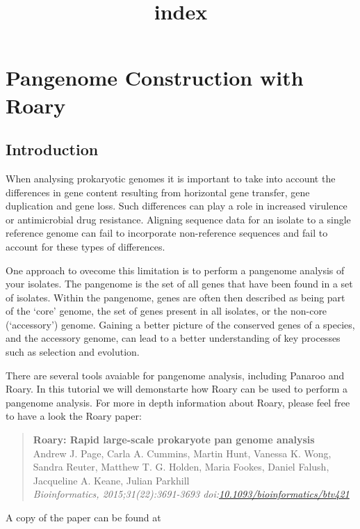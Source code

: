 \documentclass[11pt]{article}
\title{index}
\begin{document}
    \hypertarget{pangenome-construction-with-roary}{%
\section{Pangenome Construction with
Roary}\label{pangenome-construction-with-roary}}

\hypertarget{introduction}{%
\subsection{Introduction}\label{introduction}}

When analysing prokaryotic genomes it is important to take into account
the differences in gene content resulting from horizontal gene transfer,
gene duplication and gene loss. Such differences can play a role in
increased virulence or antimicrobial drug resistance. Aligning sequence
data for an isolate to a single reference genome can fail to incorporate
non-reference sequences and fail to account for these types of
differences.

One approach to ovecome this limitation is to perform a pangenome
analysis of your isolates. The pangenome is the set of all genes that
have been found in a set of isolates. Within the pangenome, genes are
often then described as being part of the `core' genome, the set of
genes present in all isolates, or the non-core (`accessory') genome.
Gaining a better picture of the conserved genes of a species, and the
accessory genome, can lead to a better understanding of key processes
such as selection and evolution.

There are several tools avaiable for pangenome analysis, including
Panaroo and Roary. In this tutorial we will demonstarte how Roary can be
used to perform a pangenome analysis. For more in depth information
about Roary, please feel free to have a look the Roary paper:

\begin{quote}
\textbf{Roary: Rapid large-scale prokaryote pan genome analysis}\\
Andrew J. Page, Carla A. Cummins, Martin Hunt, Vanessa K. Wong, Sandra
Reuter, Matthew T. G. Holden, Maria Fookes, Daniel Falush, Jacqueline A.
Keane, Julian Parkhill\\
\textit{Bioinformatics, 2015;31(22):3691-3693
doi:\href{http://bioinformatics.oxfordjournals.org/content/31/22/3691}{10.1093/bioinformatics/btv421}}
\end{quote}

A copy of the paper can be found at
\end{document}
